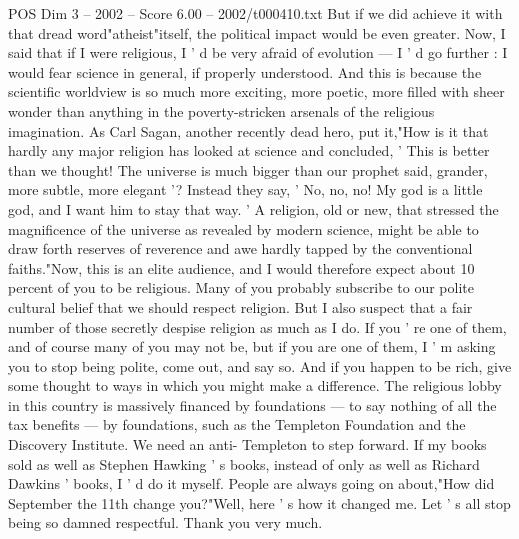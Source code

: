 \begin{textsample}{POS Dim 3 – 2002 – Score 6.00 – 2002/t000410.txt}
But if we did achieve it with that dread word"atheist"itself, the political impact would be even greater.
Now, I said that if I were religious, I ' d be very afraid of evolution — I ' d go further : I would fear science in general, if properly understood.
And this is because the scientific worldview is so much more exciting, more poetic, more filled with sheer wonder than anything in the poverty-stricken arsenals of the religious imagination.
As Carl Sagan, another recently dead hero, put it,"How is it that hardly any major religion has looked at science and concluded, ' This is better than we thought!
The universe is much bigger than our prophet said, grander, more subtle, more elegant '?
Instead they say, ' No, no, no!
My god is a little god, and I want him to stay that way. ' A religion, old or new, that stressed the magnificence of the universe as revealed by modern science, might be able to draw forth reserves of reverence and awe hardly tapped by the conventional faiths."Now, this is an elite audience, and I would therefore expect about 10 percent of you to be religious.
Many of you probably subscribe to our polite cultural belief that we should respect religion.
But I also suspect that a fair number of those secretly despise religion as much as I do.
If you ' re one of them, and of course many of you may not be, but if you are one of them, I ' m asking you to stop being polite, come out, and say so.
And if you happen to be rich, give some thought to ways in which you might make a difference.
The religious lobby in this country is massively financed by foundations — to say nothing of all the tax benefits — by foundations, such as the Templeton Foundation and the Discovery Institute.
We need an anti- Templeton to step forward.
If my books sold as well as Stephen Hawking ' s books, instead of only as well as Richard Dawkins ' books, I ' d do it myself.
People are always going on about,"How did September the 11th change you?"Well, here ' s how it changed me.
Let ' s all stop being so damned respectful.
Thank you very much.

\end{textsample}
